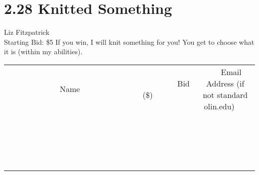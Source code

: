 \documentclass[11pt]{article}
\begin{document}
\section*{2.28 Knitted Something}
Liz Fitzpatrick
\\
Starting Bid: \$5
\newline
If you win, I will knit something for you! You get to choose what it is (within my abilities).
\\[3ex]
\begin{tabular}{c c c}
~~~~~~~~~~~~~Name~~~~~~~~~~~~~ & ~~~~~~~~~Bid (\$)~~~~~~~~~  & ~~~Email Address (if not standard olin.edu)~~~\\
 & & \\
\hline
 & & \\
\hline
 & & \\
\hline
 & & \\
\hline
 & & \\
\hline
 & & \\
\hline
 & & \\
\hline
 & & \\
\hline
 & & \\
\hline
 & & \\
\hline
 & & \\
\hline
 & & \\
\hline
 & & \\
\hline
 & & \\
\hline
 & & \\
\hline
 & & \\
\hline
 & & \\
\hline
 & & \\
\hline
 & & \\
\hline
\end{tabular}
\newpage
\end{document}
